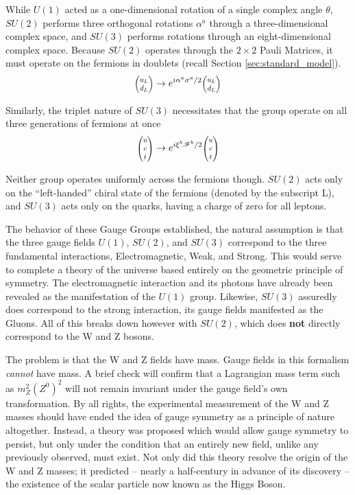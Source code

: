     While $U(1)$ acted as a one-dimensional rotation of a single complex angle $\theta$,
        $SU(2)$ performs three orthogonal rotations $\alpha^a$ through a three-dimensional complex space,
        and $SU(3)$ performs rotations through an eight-dimensional complex space.
    Because $SU(2)$ operates through the $2 \times 2$ Pauli Matrices, it must operate on the fermions in doublets
        (recall Section \ref{sec:standard_model}).
    \begin{equation}
        \minimatrix{u_L \\ d_L} \to e^{i \alpha^a \sigma^a / 2} \minimatrix{u_L \\ d_L}
    \end{equation}

    Similarly, the triplet nature of $SU(3)$ necessitates that the group operate on all three generations of fermions at once
    \begin{equation}
        \minimatrix{u\\c\\t} \to e^{i \xi^b \mathscr{F}^b / 2} \minimatrix{u\\c\\t}
    \end{equation}

    Neither group operates uniformly across the fermions though.
    $SU(2)$ acts only on the ``left-handed'' chiral state of the fermions (denoted by the subscript L),
        and $SU(3)$ acts only on the quarks, having a charge of zero for all leptons.

    The behavior of these Gauge Groups established, the natural assumption is that the three gauge fields
        $U(1)$, $SU(2)$, and $SU(3)$ correspond to the three fundamental interactions,
        Electromagnetic, Weak, and Strong.
    This would serve to complete a theory of the universe based entirely on the geometric principle of symmetry.
    The electromagnetic interaction and its photons have already been revealed as the manifestation of the $U(1)$ group. 
    Likewise, $SU(3)$ assuredly does correspond to the strong interaction, its gauge fields manifested as the Gluons.
    All of this breaks down however with $SU(2)$, which does \textbf{not} directly correspond to the W and Z bosons.

    The problem is that the W and Z fields have mass.
    Gauge fields in this formalism \textit{cannot} have mass.
    A brief check will confirm that a Lagrangian mass term such as $m_Z^2 (Z^0)^2$
        will not remain invariant under the gauge field's own transformation.
    By all rights, the experimental measurement of the W and Z masses should have
        ended the idea of gauge symmetry as a principle of nature altogether.
    Instead, a theory was proposed which would allow gauge symmetry to persist,
        but only under the condition that an entirely new field, unlike any previously observed, must exist.
    Not only did this theory resolve the origin of the W and Z masses;
        it predicted -- nearly a half-century in advance of its discovery --
        the existence of the scalar particle now known as the Higgs Boson.
    \cite{Osborn_notes}
    \cite{Peskin_book}
    \cite{Halzen_book}

